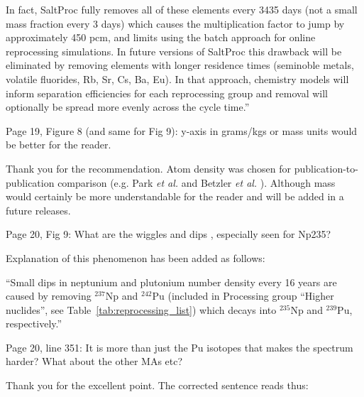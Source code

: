 \documentclass[answers,11pt]{exam}
\begin{document}
\begin{questions}
\begin{solution}
                        In fact, SaltProc fully removes
                        all of these elements every 3435 days (not a small mass fraction every 3 days)
                        which causes the multiplication factor to jump by approximately 450
                        pcm, and limits using the batch approach for online reprocessing simulations.
                        In future versions of SaltProc this drawback will be eliminated by removing
                        elements with longer residence times (seminoble metals, volatile fluorides, Rb, Sr,
                         Cs, Ba, Eu). In that approach, chemistry models will inform separation
                         efficiencies for each reprocessing group and removal will optionally be spread more
                         evenly across the cycle time.''
        \end{solution}

        \question  Page 19, Figure 8 (and same for Fig 9): y-axis in grams/kgs 
        or mass units would be better for the reader.
        \begin{solution}
                Thank you for the recommendation. Atom density was chosen for 
                publication-to-publication comparison (e.g. Park \emph{et al.} and 
                Betzler \emph{et al.}
                \cite{park_whole_2015, betzler_molten_2017}). Although mass would certainly 
                be more understandable for the reader and will be added in a future releases.
        \end{solution}

        \question  Page 20, Fig 9: What are the wiggles and dips , especially 
        seen for Np235?
        \begin{solution}
		        Explanation of this phenomenon has been added as follows:

                          ``Small dips in neptunium and plutonium number density 
                          every 16 years are caused by removing $^{237}$Np and 
                          $^{242}$Pu (included in Processing group ``Higher 
                          nuclides'', see Table~\ref{tab:reprocessing_list}) 
                          which decays into $^{235}$Np and $^{239}$Pu, 
                          respectively.''
        \end{solution}

        \question  Page 20, line 351: It is more than just the Pu isotopes that 
        makes the spectrum harder? What about the other MAs etc?
        \begin{solution}
        		Thank you for the excellent point. The corrected sentence reads thus: 
        

\end{solution}
\end{questions}
\end{document}
